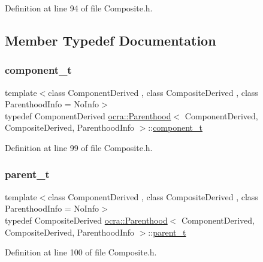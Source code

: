 Definition at line 94 of file Composite.\+h.



\subsection{Member Typedef Documentation}
\hypertarget{classocra_1_1Parenthood_a44b601577125fe0fd1d1e5ae4f143349}{}\label{classocra_1_1Parenthood_a44b601577125fe0fd1d1e5ae4f143349} 
\subsubsection{\texorpdfstring{component\+\_\+t}{component\_t}}
{\footnotesize\ttfamily template$<$class Component\+Derived , class Composite\+Derived , class Parenthood\+Info  = No\+Info$>$ \\
typedef Component\+Derived \hyperlink{classocra_1_1Parenthood}{ocra\+::\+Parenthood}$<$ Component\+Derived, Composite\+Derived, Parenthood\+Info $>$\+::\hyperlink{classocra_1_1Parenthood_a44b601577125fe0fd1d1e5ae4f143349}{component\+\_\+t}}



Definition at line 99 of file Composite.\+h.

\hypertarget{classocra_1_1Parenthood_a2f95265c57cf96bbc26afee2ac757dd6}{}\label{classocra_1_1Parenthood_a2f95265c57cf96bbc26afee2ac757dd6} 
\subsubsection{\texorpdfstring{parent\+\_\+t}{parent\_t}}
{\footnotesize\ttfamily template$<$class Component\+Derived , class Composite\+Derived , class Parenthood\+Info  = No\+Info$>$ \\
typedef Composite\+Derived \hyperlink{classocra_1_1Parenthood}{ocra\+::\+Parenthood}$<$ Component\+Derived, Composite\+Derived, Parenthood\+Info $>$\+::\hyperlink{classocra_1_1Parenthood_a2f95265c57cf96bbc26afee2ac757dd6}{parent\+\_\+t}}



Definition at line 100 of file Composite.\+h.

\hypertarget{classocra_1_1Parenthood_acdae20cb747190b5dc9dbe42290bde78}{}\label{classocra_1_1Parenthood_acdae20cb747190b5dc9dbe42290bde78} 
